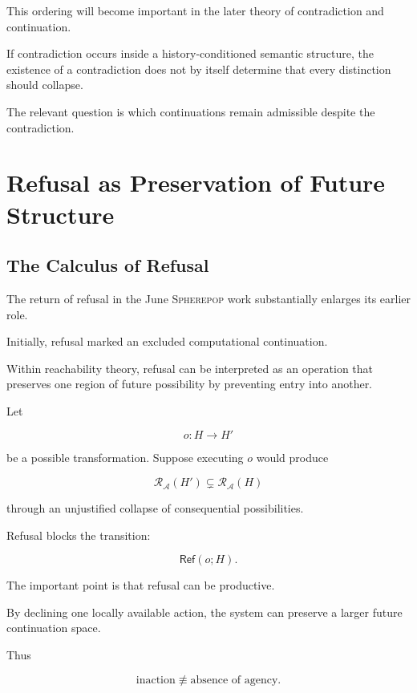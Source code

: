 \documentclass[11pt]{article}
\theoremstyle{remark}
\newcommand{\Spherepop}{\textsc{Spherepop}}
\newcommand{\Adm}{\mathcal{A}}
\newcommand{\Reach}{\mathcal{R}}
\newcommand{\refuse}{\mathsf{Ref}}
\begin{document}
This ordering will become important in the later theory of contradiction and continuation.

If contradiction occurs inside a history-conditioned semantic structure, the existence of a contradiction does not by itself determine that every distinction should collapse.

The relevant question is which continuations remain admissible despite the contradiction.

\section{Refusal as Preservation of Future Structure}

\subsection{The Calculus of Refusal}

The return of refusal in the June \Spherepop{} work substantially enlarges its earlier role.

Initially, refusal marked an excluded computational continuation.

Within reachability theory, refusal can be interpreted as an operation that preserves one region of future possibility by preventing entry into another.

Let

\begin{equation}
o:H\rightarrow H'
\end{equation}

be a possible transformation. Suppose executing $o$ would produce

\begin{equation}
\Reach_{\Adm}(H')
\subsetneq
\Reach_{\Adm}(H)
\end{equation}

through an unjustified collapse of consequential possibilities.

Refusal blocks the transition:

\begin{equation}
\refuse(o;H).
\end{equation}

The important point is that refusal can be productive.

By declining one locally available action, the system can preserve a larger future continuation space.

Thus

\begin{equation}
\text{inaction}
\not\equiv
\text{absence of agency}.
\end{equation}
\end{document}
